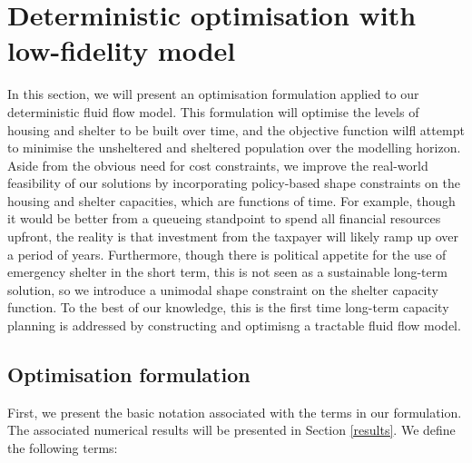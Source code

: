 \documentclass[12pt,a4paper]{article}
\begin{document}
\section{Deterministic optimisation with low-fidelity model} \label{do}
%
In this section, we will present an optimisation formulation applied to our deterministic fluid flow model. This formulation will optimise the levels of housing and shelter to be built over time, and the objective function wilfl attempt to minimise the unsheltered and sheltered population over the modelling horizon. Aside from the obvious need for cost constraints, we improve the real-world feasibility of our solutions by incorporating policy-based shape constraints on the housing and shelter capacities, which are functions of time. For example, though it would be better from a queueing standpoint to spend all financial resources upfront, the reality is that investment from the taxpayer will likely ramp up over a period of years. Furthermore, though there is political appetite for the use of emergency shelter in the short term, this is not seen as a sustainable long-term solution, so we introduce a unimodal shape constraint on the shelter capacity function. To the best of our knowledge, this is the first time long-term capacity planning is addressed by constructing and optimisng a tractable fluid flow model. 
%
\subsection{Optimisation formulation} \label{opt}
%
First, we present the basic notation associated with the terms in our formulation. The associated numerical results will be presented in Section \ref{results}. We define the following terms:
\end{document}
